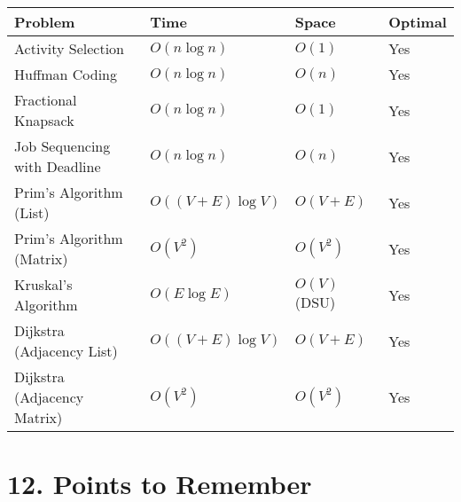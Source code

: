 \documentclass[14pt]{extarticle}
\begin{document}
\begin{center}
\begin{tabular}{|l|l|l|l|}
\hline
\textbf{Problem}                & \textbf{Time}               & \textbf{Space}         & \textbf{Optimal} \\
\hline
Activity Selection              & $O(n \log n)$               & $O(1)$                 & Yes              \\
Huffman Coding                  & $O(n \log n)$               & $O(n)$                 & Yes              \\
Fractional Knapsack             & $O(n \log n)$               & $O(1)$                 & Yes              \\
Job Sequencing with Deadline    & $O(n \log n)$               & $O(n)$                 & Yes              \\
Prim's Algorithm (List)         & $O((V + E) \log V)$         & $O(V + E)$             & Yes              \\
Prim's Algorithm (Matrix)       & $O(V^2)$                    & $O(V^2)$               & Yes              \\
Kruskal's Algorithm             & $O(E \log E)$               & $O(V)$ (DSU)           & Yes              \\
Dijkstra (Adjacency List)       & $O((V + E) \log V)$         & $O(V + E)$             & Yes              \\
Dijkstra (Adjacency Matrix)     & $O(V^2)$                    & $O(V^2)$               & Yes              \\
\hline
\end{tabular}
\end{center}

\newpage

\section*{12. Points to Remember}
\end{document}
